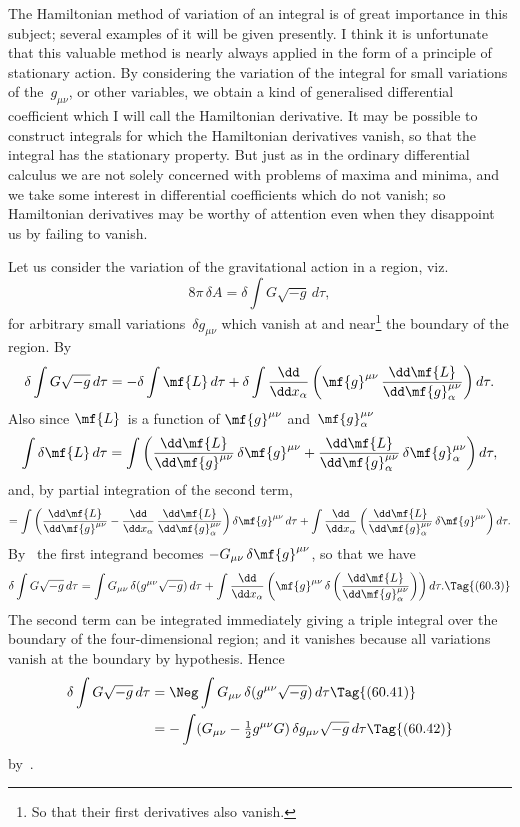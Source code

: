 \documentclass[12pt]{book}
\begin{document}
The Hamiltonian method of variation of an integral is of great importance
in this subject; several examples of it will be given presently. I think it is
unfortunate that this valuable method is nearly always applied in the form of
a principle of stationary action. By considering the variation of the integral
for small variations of the~$g_{\mu\nu}$, or other variables, we obtain a kind of generalised
differential coefficient which I will call the Hamiltonian derivative. It
may be possible to construct integrals for which the Hamiltonian derivatives
vanish, so that the integral has the stationary property. But just as in the
ordinary differential calculus we are not solely concerned with problems of
maxima and minima, and we take some interest in differential coefficients
which do not vanish; so Hamiltonian derivatives may be worthy of attention
even when they disappoint us by failing to vanish.

Let us consider the variation of the gravitational action in a region, viz.\
\[
8\pi\, \delta A = \delta \int G\sqrt{-g}\, d\tau,
\]
for arbitrary small variations~$\delta g_{\mu\nu}$ which vanish at and near\footnote
  {So that their first derivatives also vanish.}
the boundary of
the region. By~
\[
\delta \int G\sqrt{-g}\, d\tau
= -\delta \int \mf{L}\, d\tau
+ \delta \int \frac{\dd}{\dd x_{\alpha}} \left(\mf{g}^{\mu\nu}\, \frac{\dd\mf{L}}{\dd\mf{g}_{\alpha}^{\mu\nu}}\right) d\tau.
\]
Also since $\mf{L}$~is a function of $\mf{g}^{\mu\nu}$ and~$\mf{g}_{\alpha}^{\mu\nu}$
\[
\int \delta\mf{L}\, d\tau
  = \int \left(
  \frac{\dd\mf{L}}{\dd\mf{g}^{\mu\nu}}\, \delta\mf{g}^{\mu\nu}
+ \frac{\dd\mf{L}}{\dd\mf{g}_{\alpha}^{\mu\nu}}\, \delta\mf{g}_{\alpha}^{\mu\nu}
\right) d\tau,
\]
and, by partial integration of the second term,
\[
= \int \left(
\frac{\dd\mf{L}}{\dd\mf{g}^{\mu\nu}}
- \frac{\dd}{\dd x_{\alpha}}\, \frac{\dd\mf{L}}{\dd\mf{g}_{\alpha}^{\mu\nu}}\right) \delta\mf{g}^{\mu\nu}\, d\tau
+ \int \frac{\dd}{\dd x_{\alpha}} \left(\frac{\dd\mf{L}}{\dd\mf{g}_{\alpha}^{\mu\nu}}\, \delta\mf{g}^{\mu\nu}\right) d\tau.
\]
By~ the first integrand becomes $-G_{\mu\nu}\, \delta\mf{g}^{\mu\nu}$, so that we have
\[
\delta \int G\sqrt{-g}\, d\tau
= \int G_{\mu\nu}\, \delta(g^{\mu\nu} \sqrt{-g})\, d\tau
+ \int \frac{\dd}{\dd x_{\alpha}} \left(\mf{g}^{\mu\nu}\, \delta\left(\frac{\dd\mf{L}}{\dd\mf{g}_{\alpha}^{\mu\nu}}\right)\right) d\tau.
\Tag{(60.3)}
\]
The second term can be integrated immediately giving a triple integral over
the boundary of the four-dimensional region; and it vanishes because all
variations vanish at the boundary by hypothesis. Hence
\begin{align*}
  \delta \int G\sqrt{-g}\, d\tau
  &= \Neg \int G_{\mu\nu}\, \delta(g^{\mu\nu} \sqrt{-g})\, d\tau
  \Tag{(60.41)} \\
  &= -\int (G_{\mu\nu} - \tfrac{1}{2}g^{\mu\nu}G)\, \delta g_{\mu\nu} \sqrt{-g}\, d\tau
\Tag{(60.42)}
\end{align*}
by~.
\end{document}
